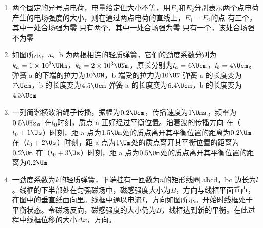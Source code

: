 \documentclass[\gkver]{gaokaozhenti}
\begin{document}
\begin{enumerate}
\item
两个固定的异号点电荷，电量给定但大小不等，用$E_{1}$和$E_{2}$分别表示两个点电荷产生的电场强度的大小，则在通过两点电荷的直线上，$E_{1}=E_{2}$的点
{有三个，其中一处合场强为零}
{只有两个，其中一处合场强为零}
{只有一个，该处合场强不为零}

\item
如图所示，a、b 为两根相连的轻质弹簧，它们的劲度系数分别为$k_{a}=1\times10^{3}\UNm$，$k_{b}=2\times10^{3}\UNm$，原长分别为$l_{a}=6\Ucm$，$l_{b}=4\Ucm$。
{弹簧 a 的下端的拉力为$10\UN$，b 端受的拉力为$10\UN$}
{弹簧 a 的长度变为$7\Ucm$，b 的长度变为$4.5\Ucm$}
{弹簧 a 的长度变为$6.4\Ucm$，b 的长度变为$4.3\Ucm$}

\item
一列简谐横波沿绳子传播，振幅为$0.2\Ucm$，传播速度为$1\Ums$，频率为$0.5\UHz$。在$t_{0}$时刻，质点 a 正好经过平衡位置。沿着波的传播方向
{在（$t_{0}+1\Us$）时刻，距 a 点为$1.5\Um$处的质点离开其平衡位置的距离为$0.2\Um$}
{在（$t_{0}+2\Us$）时刻，距 a 点为$1\Um$处的质点离开其平衡位置的距离为$0.2\Um$}
{在（$t_{0}+3\Us$）时刻，距 a 点为$0.5\Um$处的质点离开其平衡位置的距离为$0.2\Um$}

\item
一劲度系数为$k$的轻质弹簧，下端挂有一匝数为$n$的矩形线圈 abcd。bc 边长为$l$。线框的下半部处在匀强磁场中，磁感强度大小为$B$，方向与线框平面垂直，在图中的垂直纸面向里。线框中通以电流$I$，方向如图所示。开始时线框处于平衡状态。令磁场反向，磁感强度的大小仍为$B$，线框达到新的平衡。在此过程中线框位移的大小$\Delta x$，方向。


\end{enumerate}
\end{document}

